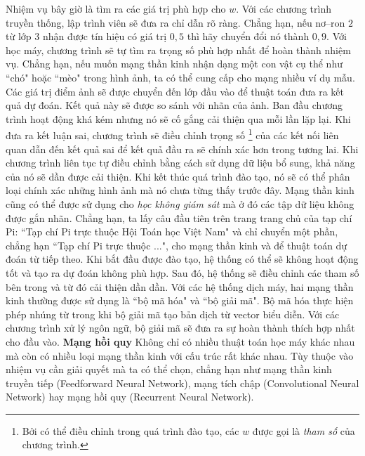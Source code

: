 \begin{multicols}{2}
\begin{figure}[H]
		\vspace*{-20pt}
	\end{figure}
	Nhiệm vụ bây giờ là tìm ra các giá trị phù hợp cho $w$. Với các chương trình truyền thống, lập trình viên sẽ đưa ra chỉ dẫn rõ ràng. Chẳng hạn, nếu nơ--ron $2$ từ lớp $3$ nhận được tín hiệu có giá trị $0,5$ thì hãy chuyển đổi nó thành $0,9$. Với học máy, chương trình sẽ tự tìm ra trọng số phù hợp nhất để hoàn thành nhiệm vụ. Chẳng hạn, nếu muốn mạng thần kinh nhận dạng một con vật cụ thể như ``chó" hoặc ``mèo" trong hình ảnh, ta có thể cung cấp cho mạng nhiều ví dụ mẫu. Các giá trị điểm ảnh sẽ được chuyển đến lớp đầu vào để thuật toán đưa ra kết quả dự đoán. Kết quả này sẽ được so sánh với nhãn của ảnh. Ban đầu chương trình hoạt động khá kém nhưng nó sẽ cố gắng cải thiện qua mỗi lần lặp lại. Khi đưa ra kết luận sai, chương trình sẽ điều chỉnh trọng số \footnote[3]{\color{timhieukhoahoc}Bởi có thể điều chỉnh trong quá trình đào tạo, các $w$ được gọi là \textit{tham số} của chương trình.} của các kết nối liên quan dẫn đến kết quả sai để kết quả đầu ra sẽ chính xác hơn trong tương lai. Khi chương trình liên tục tự điều chỉnh bằng cách sử dụng dữ liệu bổ sung, khả năng của nó sẽ dần được cải thiện. Khi kết thúc quá trình đào tạo, nó sẽ có thể phân loại chính xác những hình ảnh mà nó chưa từng thấy trước đây.
	\vskip 0.1cm
	Mạng thần kinh cũng có thể được sử dụng cho \textit{học không giám sát} mà ở đó các tập dữ liệu không được gắn nhãn. Chẳng hạn, ta lấy câu đầu tiên trên trang trang chủ của tạp chí Pi: ``Tạp chí Pi trực thuộc Hội Toán học Việt Nam" và chỉ chuyển một phần, chẳng hạn ``Tạp chí Pi trực thuộc ...", cho mạng thần kinh và để thuật toán dự đoán từ tiếp theo. Khi bắt đầu được đào tạo, hệ thống có thể sẽ không hoạt động tốt và tạo ra dự đoán không phù hợp. Sau đó, hệ thống sẽ điều chỉnh các tham số bên trong và từ đó cải thiện dần dần.
	\vskip 0.1cm
	Với các hệ thống dịch máy, hai mạng thần kinh thường được sử dụng là ``bộ mã hóa" và ``bộ giải mã". Bộ mã hóa thực hiện phép nhúng từ trong khi bộ giải mã tạo bản dịch từ vector biểu diễn. Với các chương trình xử lý ngôn ngữ, bộ giải mã sẽ đưa ra sự hoàn thành thích hợp nhất cho đầu vào.
	\vskip 0.1cm
	\textbf{\color{timhieukhoahoc}Mạng hồi quy}
	\vskip 0.1cm
	Không chỉ có nhiều thuật toán học máy khác nhau mà còn có nhiều loại mạng thần kinh với cấu trúc rất khác nhau. Tùy thuộc vào nhiệm vụ cần giải quyết mà ta có thể chọn, chẳng hạn như mạng thần kinh truyền tiếp (Feedforward Neural Network), mạng tích chập (Convolutional Neural Network) hay mạng hồi quy (Recurrent Neural Network). 
	\vskip 0.1cm

\end{multicols}
